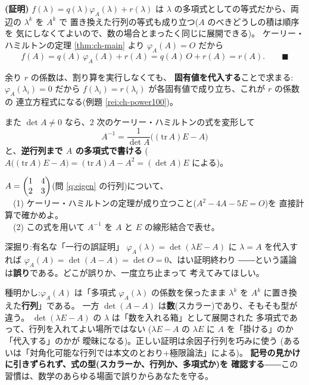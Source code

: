 \noindent\textbf{(証明)}\quad
$f(\lambda) = q(\lambda)\varphi_A(\lambda) + r(\lambda)$ は
$\lambda$ の多項式としての等式だから、両辺の $\lambda^k$ を $A^k$ で
置き換えた行列の等式も成り立つ($A$ のべきどうしの積は順序を
気にしなくてよいので、数の場合とまったく同じに展開できる)。
ケーリー・ハミルトンの定理 \ref{thm:ch-main} より
$\varphi_A(A) = O$ だから
\[
f(A) = q(A)\,\varphi_A(A) + r(A) = q(A)\,O + r(A) = r(A). \qquad\blacksquare
\]

余り $r$ の係数は、割り算を実行しなくても、
\textbf{固有値を代入する}ことで求まる:$\varphi_A(\lambda_i) = 0$ だから
$f(\lambda_i) = r(\lambda_i)$ が各固有値で成り立ち、これが $r$ の係数の
連立方程式になる(例題 \ref{rei:ch-power100})。

また $\det A \neq 0$ なら、$2$ 次のケーリー・ハミルトンの式を変形して
\[
A^{-1} = \frac{1}{\det A}\bigl((\mathrm{tr}\,A)E - A\bigr)
\]
と、\textbf{逆行列まで $A$ の多項式で書ける}
($A\bigl((\mathrm{tr}\,A)E - A\bigr) = (\mathrm{tr}\,A)A - A^2
= (\det A)E$ による)。

\begin{mondai}\label{q:ch}
$A = \begin{pmatrix}1 & 4 \\ 2 & 3\end{pmatrix}$(問 \ref{q:eigen} の行列)について、\\
　(1) ケーリー・ハミルトンの定理が成り立つこと($A^2 - 4A - 5E = O$)を
直接計算で確かめよ。\\
　(2) この式を用いて $A^{-1}$ を $A$ と $E$ の線形結合で表せ。
\end{mondai}

\begin{itembox}[l]{深掘り:有名な「一行の誤証明」}
$\varphi_A(\lambda) = \det(\lambda E - A)$ に $\lambda = A$ を代入すれば
$\varphi_A(A) = \det(A - A) = \det O = 0$、はい証明終わり
――という議論は\textbf{誤り}である。どこが誤りか、一度立ち止まって
考えてみてほしい。

種明かし:$\varphi_A(A)$ は「多項式 $\varphi_A(\lambda)$ の係数を保ったまま
$\lambda^k$ を $A^k$ に置き換えた\textbf{行列}」である。
一方 $\det(A - A)$ は\textbf{数}(スカラー)であり、そもそも型が違う。
$\det(\lambda E - A)$ の $\lambda$ は「数を入れる箱」として展開された
多項式であって、行列を入れてよい場所ではない
($\lambda E - A$ の $\lambda E$ に $A$ を「掛ける」のか「代入する」のかが
曖昧になる)。正しい証明は余因子行列を巧みに使う
(あるいは「対角化可能な行列では本文のとおり+極限論法」による)。
\textbf{記号の見かけに引きずられず、式の型(スカラーか、行列か、多項式か)を
確認する}――この習慣は、数学のあらゆる場面で誤りからあなたを守る。
\end{itembox}

